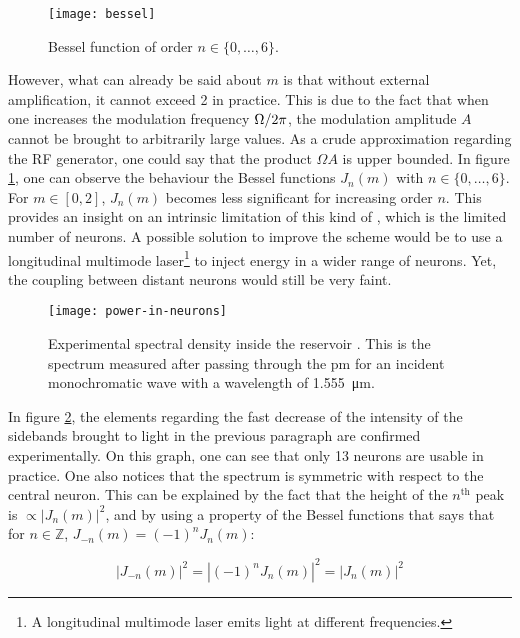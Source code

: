 \begin{figure}[h]
	\centering
	\texttt{[image: bessel]}
	\caption{Bessel function of order $n \in \{0,\dots,6\}$.}
	\label{bessel}
\end{figure}

However, what can already be said about $m$ is that without external amplification, it cannot exceed 2 in practice. This is due to the fact that when one increases the modulation frequency $\Omega/2\pi$, the modulation amplitude $A$ cannot be brought to arbitrarily large values. As a crude approximation regarding the RF generator, one could say that the product $\Omega A$ is upper bounded. In figure \ref{bessel}, one can observe the behaviour the Bessel functions $J_n(m)$ with $n \in \{0,\dots, 6\}$. For $m \in [0,2]$, $J_n(m)$ becomes less significant for increasing order $n$. This provides an insight on an intrinsic limitation of this kind of \rcer, which is the limited number of neurons. A possible solution to improve the scheme would be to use a longitudinal multimode laser\footnote{A longitudinal multimode laser emits light at different frequencies.} to inject energy in a wider range of neurons. Yet, the coupling between distant neurons would still be very faint.\\

\begin{figure}[h]
	\centering
	\texttt{[image: power-in-neurons]}
	\caption{Experimental spectral density inside the reservoir \cite{AkroutAkram2016Pprc}. This is the spectrum measured after passing through the \gls{pm} for an incident monochromatic wave with a wavelength of \SI{1.555}{\micro\metre}.}
	\label{power-in-neurons}
\end{figure}

In figure \ref{power-in-neurons}, the elements regarding the fast decrease of the intensity of the sidebands brought to light in the previous paragraph are confirmed experimentally. On this graph, one can see that only 13 neurons are usable in practice. One also notices that the spectrum is symmetric with respect to the central neuron. This can be explained by the fact that the height of the $n^{\text{th}}$ peak is $\propto |J_n(m)|^2$, and by using a property of the Bessel functions that says that for $n \in \mathbb{Z}$, $J_{-n}(m)=(-1)^n J_n(m)$:

\begin{equation}
	|J_{-n}(m)|^2 = |(-1)^n J_n(m)|^2 = |J_n(m)|^2
\end{equation}

